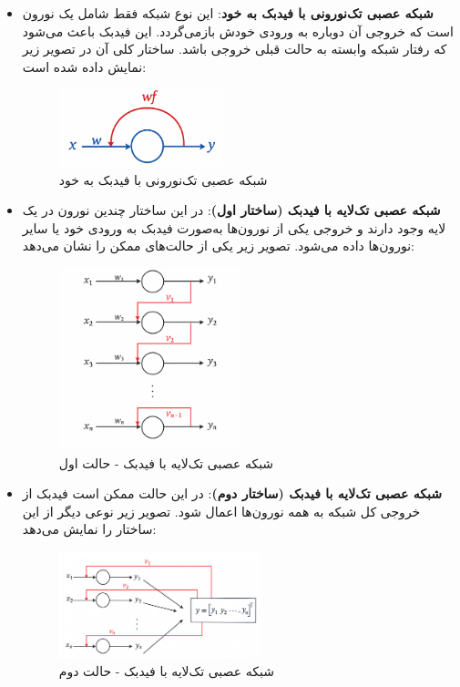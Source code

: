 \begin{enumerate}
	\begin{itemize}
		\item \textbf{شبکه عصبی تک‌نورونی با فیدبک به خود}:  
		این نوع شبکه فقط شامل یک نورون است که خروجی آن دوباره به ورودی خودش بازمی‌گردد. این فیدبک باعث می‌شود که رفتار شبکه وابسته به حالت قبلی خروجی باشد. ساختار کلی آن در تصویر زیر نمایش داده شده است:
		
		\begin{figure}[H]
			\centering
			\includegraphics[width=0.45\textwidth]{./figures/tak.png}
			\caption{شبکه عصبی تک‌نورونی با فیدبک به خود}
		\end{figure}
		
		\item \textbf{شبکه عصبی تک‌لایه با فیدبک (ساختار اول)}:  
		در این ساختار چندین نورون در یک لایه وجود دارند و خروجی یکی از نورون‌ها به‌صورت فیدبک به ورودی خود یا سایر نورون‌ها داده می‌شود. تصویر زیر یکی از حالت‌های ممکن را نشان می‌دهد:
		
		\begin{figure}[H]
			\centering
			\includegraphics[width=0.50\textwidth]{./figures/tartibi.png}
			\caption{شبکه عصبی تک‌لایه با فیدبک - حالت اول}
		\end{figure}
		
		\item \textbf{شبکه عصبی تک‌لایه با فیدبک (ساختار دوم)}:  
		در این حالت ممکن است فیدبک از خروجی کل شبکه به همه نورون‌ها اعمال شود. تصویر زیر نوعی دیگر از این ساختار را نمایش می‌دهد:
		
		\begin{figure}[H]
			\centering
			\includegraphics[width=0.55\textwidth]{./figures/total.png}
			\caption{شبکه عصبی تک‌لایه با فیدبک - حالت دوم}
		\end{figure}
		

\end{itemize}
\end{enumerate}
